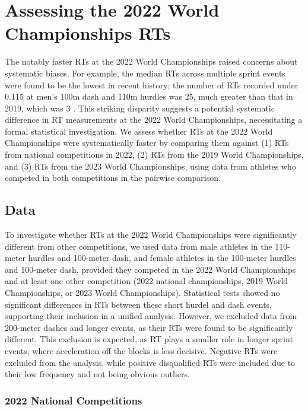 \documentclass[12pt, letterpaper]{article}
\begin{document}
\section{Assessing the 2022 World Championships RTs}
\label{sec:problem1}

The notably faster RTs at the 2022 World Championships
raised concerns about systematic biases. 
For example,  the median RTs across multiple sprint events were found
to be the lowest in recent history; the number of RTs recorded under
0.115 at men’s 100m dash and 110m hurdles was 25, much greater than that in
2019, which was 3 \citep{johnson2022was}. This striking disparity
suggests a potential systematic difference in RT measurements at the
2022 World Championships, necessitating a formal statistical
investigation. We assess whether RTs at the 2022 World Championships
were systematically faster by comparing them against (1) RTs from national
competitions in 2022, (2) RTs from the 2019 World Championships, and (3) RTs 
from the 2023 World Championships, using data from athletes who competed in both 
competitions in the pairwise comparison.


\subsection{Data}
\label{sec:data_2022}

To investigate whether RTs at the 2022 World Championships
were significantly different from other competitions, we
used data from male athletes in the 110-meter hurdles and 100-meter
dash, and female athletes in the 100-meter hurdles and 100-meter dash,
provided they competed in the 2022 World Championships and at least
one other competition (2022 national championships, 2019 World
Championships, or 2023 World Championships). Statistical tests showed no
significant differences in RTs between these short hurdel and dash events, 
supporting their inclusion in a unified analysis. However, we excluded data from
200-meter dashes and longer events, as their RTs were found
to be significantly different. This exclusion is expected, as RT plays a smaller 
role in longer sprint events, where acceleration off the blocks is less decisive.
Negative RTs were excluded from the analysis, while positive disqualified RTs
were included due to their low frequency and not being obvious outliers.

\subsubsection{2022 National Competitions}
\label{sec:datanational}
\end{document}
